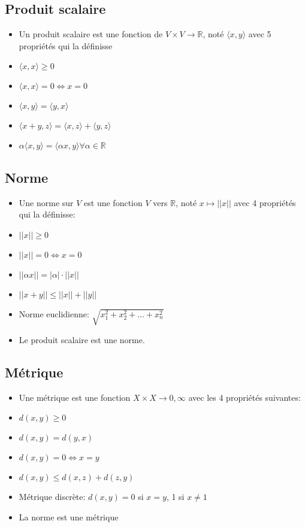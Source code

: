 \documentclass[12pt]{book}
\let\Bbb\mathbb
\theoremstyle{definition}
\begin{document}
\subsection{Produit scalaire}
\begin{itemize}
    \item Un produit scalaire est une fonction de $V \times V \to \Bbb R$, noté $\langle x, y \rangle$ avec 5 propriétés qui la définisse
    \item $\langle x, x \rangle \geq 0$
    \item $\langle x, x \rangle = 0 \iff x = 0$
    \item $\langle x, y \rangle = \langle y, x \rangle$
    \item $\langle x + y, z\rangle = \langle x, z \rangle + \langle y, z \rangle$
    \item $\alpha\langle x, y \rangle = \langle \alpha x, y \rangle \forall \alpha \in \Bbb R$
\end{itemize}
\subsection{Norme}
\begin{itemize}
    \item Une norme sur $V$ est une fonction $V$ vers $\Bbb R$, noté $x \mapsto ||x||$ avec 4 propriétés qui la définisse:
    \item $||x|| \geq 0$
    \item $||x|| = 0 \iff x = 0$
    \item $||\alpha x|| = |\alpha| \cdot ||x||$
    \item $||x + y || \leq ||x|| + ||y||$
    \item Norme euclidienne: $\sqrt{x_1^2 + x_2^2 + \dots + x_n^2}$
    \item Le produit scalaire est une norme.
\end{itemize}
\subsection{Métrique}
\begin{itemize}
    \item Une métrique est une fonction $X \times X \to 0, \infty$ avec les 4 propriétés suivantes:
    \item $d(x,y) \geq 0$
    \item $d(x,y) = d(y, x)$
    \item $d(x,y) = 0 \iff x = y$
    \item $d(x,y) \leq d(x, z) + d(z, y)$
    \item Métrique discrète: $d(x,y) = 0$ si $x = y$, 1 si $x \neq 1$
    \item La norme est une métrique
\end{itemize}
\end{document}
